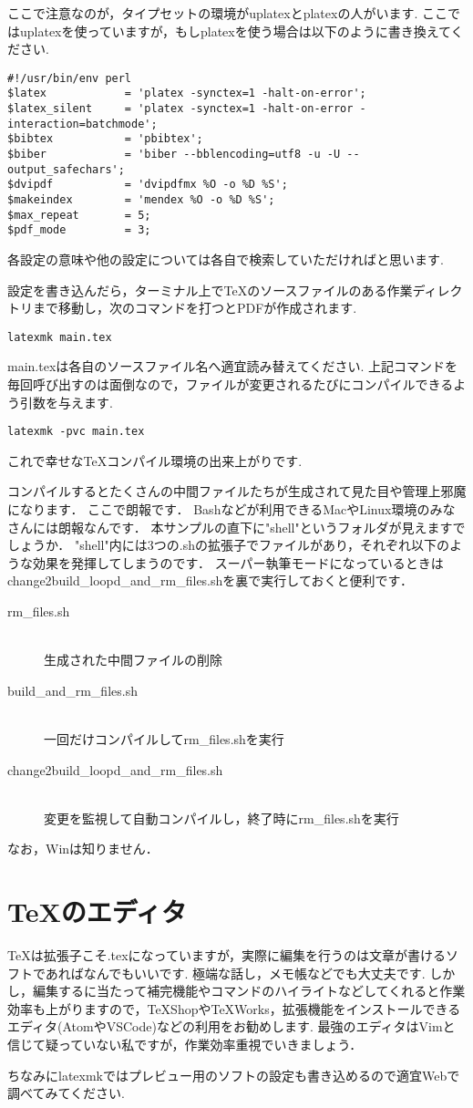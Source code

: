 ここで注意なのが，タイプセットの環境がuplatexとplatexの人がいます.
ここではuplatexを使っていますが，もしplatexを使う場合は以下のように書き換えてください.

\begin{verbatim}
#!/usr/bin/env perl
$latex            = 'platex -synctex=1 -halt-on-error';
$latex_silent     = 'platex -synctex=1 -halt-on-error -interaction=batchmode';
$bibtex           = 'pbibtex';
$biber            = 'biber --bblencoding=utf8 -u -U --output_safechars';
$dvipdf           = 'dvipdfmx %O -o %D %S';
$makeindex        = 'mendex %O -o %D %S';
$max_repeat       = 5;
$pdf_mode         = 3;
\end{verbatim}
各設定の意味や他の設定については各自で検索していただければと思います.

設定を書き込んだら，ターミナル上でTeXのソースファイルのある作業ディレクトリまで移動し，次のコマンドを打つとPDFが作成されます.
\begin{verbatim}
latexmk main.tex
\end{verbatim}
main.texは各自のソースファイル名へ適宜読み替えてください.
上記コマンドを毎回呼び出すのは面倒なので，ファイルが変更されるたびにコンパイルできるよう引数を与えます.
\begin{verbatim}
latexmk -pvc main.tex
\end{verbatim}
これで幸せなTeXコンパイル環境の出来上がりです.

コンパイルするとたくさんの中間ファイルたちが生成されて見た目や管理上邪魔になります．
ここで朗報です．
Bashなどが利用できるMacやLinux環境のみなさんには朗報なんです．
本サンプルの直下に"shell"というフォルダが見えますでしょうか．
"shell"内には3つの.shの拡張子でファイルがあり，それぞれ以下のような効果を発揮してしまうのです．
スーパー執筆モードになっているときはchange2build\_loopd\_and\_rm\_files.shを裏で実行しておくと便利です．
\begin{description}
    \item[rm\_files.sh]\mbox{}\\
        生成された中間ファイルの削除
    \item[build\_and\_rm\_files.sh]\mbox{}\\
        一回だけコンパイルしてrm\_files.shを実行
    \item[change2build\_loopd\_and\_rm\_files.sh]\mbox{}\\
        変更を監視して自動コンパイルし，終了時にrm\_files.shを実行
\end{description}
なお，Winは知りません．

\section{TeXのエディタ}

TeXは拡張子こそ.texになっていますが，実際に編集を行うのは文章が書けるソフトであればなんでもいいです.
極端な話し，メモ帳などでも大丈夫です.
しかし，編集するに当たって補完機能やコマンドのハイライトなどしてくれると作業効率も上がりますので，TeXShopやTeXWorks，拡張機能をインストールできるエディタ(AtomやVSCode)などの利用をお勧めします.
最強のエディタはVimと信じて疑っていない私ですが，作業効率重視でいきましょう．

ちなみにlatexmkではプレビュー用のソフトの設定も書き込めるので適宜Webで調べてみてください.


